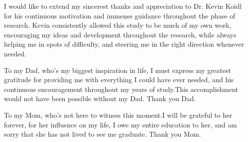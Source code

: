\documentclass[a4paper, 12pt, oneside]{report}         %
\begin{document}

\thesistitlepage                                  %

\thesisdeclarationpage                %

\thesispermissionpage                 %


\begin{thesisacknowledgments}                     %
I would like to extend my sincerest thanks and appreciation to Dr. Kevin Koidl for his continuous motivation and immense guidance throughout the phase of research. Kevin consistently allowed this study to be much of my own work, encouraging my ideas and development throughout the research, while always helping me in spots of difficulty, and steering me in the right direction whenever needed.

To my Dad, who’s my biggest inspiration in life, I must express my greatest gratitude for providing me with everything I could have ever needed, and his continuous encouragement throughout my years of study.This accomplishment would not have been possible without my Dad. Thank you Dad.

To my Mom, who's not here to witness this moment.I will be grateful to her forever, for her influence on my life, I owe my entire education to her, and am sorry that she has not lived to see me graduate. Thank you Mom.
\end{thesisacknowledgments}                      %
\end{document}
